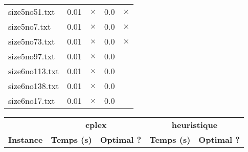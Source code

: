 \documentclass{article}
\begin{document}
\begin{center}
\begin{tabular}{lrrrr}
\\
size5no51.txt & 0.01 & 
$\times$
 & 0.0 & 
$\times$
\\
size5no7.txt & 0.01 & 
$\times$
 & 0.0 & 
$\times$
\\
size5no73.txt & 0.01 & 
$\times$
 & 0.0 & 
$\times$
\\
size5no97.txt & 0.01 & 
$\times$
 & 0.0 & 
\\
size6no113.txt & 0.01 & 
$\times$
 & 0.0 & 
\\
size6no138.txt & 0.01 & 
$\times$
 & 0.0 & 
\\
size6no17.txt & 0.01 & 
$\times$
 & 0.0 & 
\\
\hline\end{tabular}
\end{center}

\newpage
\begin{center}
\renewcommand{\arraystretch}{1.4} 
 \begin{tabular}{lrrrr}
	\hline
 & \multicolumn{2}{c}{\textbf{cplex}} & \multicolumn{2}{c}{\textbf{heuristique}}\\
\textbf{Instance}  & \textbf{Temps (s)} & \textbf{Optimal ?}  & \textbf{Temps (s)} & \textbf{Optimal ?} \\\hline


\end{tabular}
\end{center}
\end{document}
